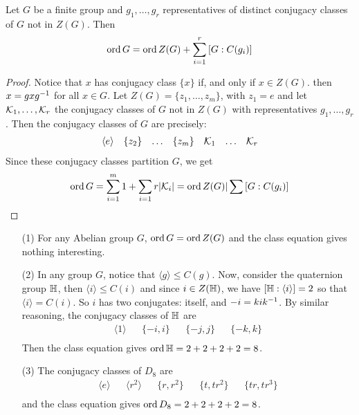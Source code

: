 \begin{theorem}\label{theorem_4.3.2}
  Let $G$ be a finite group and  $g_1, \dots, g_r$ representatives of distinct
  conjugacy classes of $G$ not in  $Z(G)$. Then
  \begin{equation*}
    \operatorname{ord}{G}=\operatorname{ord}{Z(G)}+\sum_{i=1}^r{[G:C(g_i)]}
  \end{equation*}
\end{theorem}
\begin{proof}
  Notice that $x$ has conjugacy class  $\{x\}$ if, and only if $x \in Z(G)$.
  then $x=gxg^{-1}$ for all $x \in G$. Let  $Z(G)=\{z_1, \dots, z_m\}$, with
  $z_1=e$ and let $\mathcal{K}_1, \dots, \mathcal{K}_r$ the conjugacy classes of $G$ not in
  $Z(G)$ with representatives $g_1, \dots, g_r$. Then the conjugacy classes of
  $G$ are precisely:
  \begin{align*}
    \langle e \rangle && \{z_2\} && \dots && \{z_m\} && \mathcal{K}_1 && \dots && \mathcal{K}_r   \\
  \end{align*}
  Since these conjugacy classes partition $G$, we get
  \begin{equation*}
    \operatorname{ord}{G}=\sum_{i=1}^m{1}+\sum_{i=1}{r}{|\mathcal{K}_i|}=\operatorname{ord}{Z(G)}|\sum{[G:C(g_i)]}
  \end{equation*}
\end{proof}

\begin{example}\label{example_4.8}
  \begin{enumerate}
    \item[(1)] For any Abelian group $G$,  $\operatorname{ord}{G}=\operatorname{ord}{Z(G)}$ and the
      class equation gives nothing interesting.

    \item[(2)] In any group $G$, notice that  $\langle g \rangle \leq C(g)$.
      Now, consider the quaternion group $\mathbb{H}$, then
      $\langle i \rangle \leq C(i)$ and since $i \in Z(\mathbb{H})$, we have
      $[\mathbb{H}:\langle i \rangle]=2$ so that $\langle i \rangle=C(i)$. So $i$
      has two conjugates: itself, and  $-i=kik^{-1}$. By similar reasoning,
      the conjugacy classes of $\mathbb{H}$ are
      \begin{align*}
        \langle 1 \rangle && \{-i,i\} && \{-j,j\} && \{-k,k\}   \\
      \end{align*}
      Then the class equation gives $\operatorname{ord}{\mathbb{H}}=2+2+2+2=8$.

    \item[(3)] The conjugacy classes of $D_8$ are
      \begin{align*}
        \langle e \rangle && \langle r^2 \rangle &&\{r,r^2\} &&
        \{t,tr^2\} && \{tr,tr^3\}   \\
      \end{align*}
      and the class equation gives $\operatorname{ord}{D_8}=2+2+2+2=8$.
  \end{enumerate}
\end{example}

